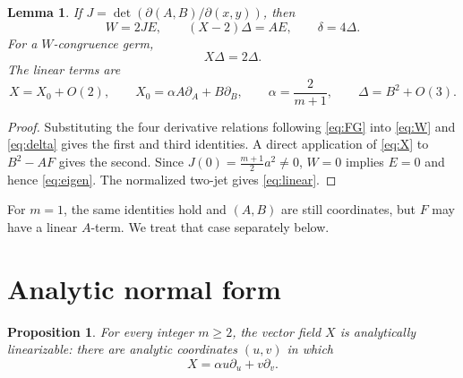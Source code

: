 \documentclass[11pt]{article}
\newtheorem{lemma}[theorem]{Lemma}
\newtheorem{proposition}[theorem]{Proposition}
\theoremstyle{remark}
\begin{document}
\begin{lemma}\label{lem:identities}
If $J=\det(\partial(A,B)/\partial(x,y))$, then
\begin{equation}\label{eq:identities}
 W=2JE,
 \qquad
 (X-2)\Delta=AE,
 \qquad
 \delta=4\Delta.
\end{equation}
For a $W$-congruence germ,
\begin{equation}\label{eq:eigen}
 X\Delta=2\Delta.
\end{equation}
The linear terms are
\begin{equation}\label{eq:linear}
 X=X_0+O(2),
 \qquad
 X_0=\alpha A\partial_A+B\partial_B,
 \qquad
 \alpha=\frac{2}{m+1},
 \qquad
 \Delta=B^2+O(3).
\end{equation}
\end{lemma}

\begin{proof}
Substituting the four derivative relations following \eqref{eq:FG} into
\eqref{eq:W} and \eqref{eq:delta} gives the first and third identities.
A direct application of \eqref{eq:X} to $B^2-AF$ gives the second.
Since $J(0)=\frac{m+1}{2}a^2\ne0$, $W=0$ implies $E=0$ and hence
\eqref{eq:eigen}.  The normalized two-jet gives \eqref{eq:linear}.
\end{proof}

For $m=1$, the same identities hold and $(A,B)$ are still coordinates,
but $F$ may have a linear $A$-term.  We treat that case separately below.

\section{Analytic normal form}

\begin{proposition}\label{prop:linearization}
For every integer $m\ge2$, the vector field $X$ is analytically linearizable:
there are analytic coordinates $(u,v)$ in which
\begin{equation}\label{eq:linearized}
 X=\alpha u\partial_u+v\partial_v.
\end{equation}
\end{proposition}
\end{document}

